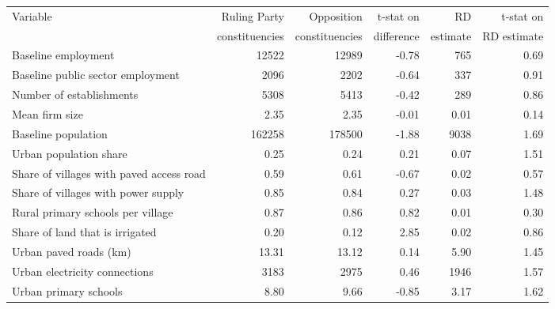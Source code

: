 \begin{tabular}{l r r r r r}\hline\hline Variable & Ruling Party & Opposition & t-stat on & RD & t-stat on \\ & constituencies & constituencies & difference & estimate & RD estimate \\ \hline
Baseline employment &  12522 &  12989 & -0.78 &    765 &  0.69\\
\hspace{1 cm}Baseline public sector employment &   2096 &   2202 & -0.64 &    337 &  0.91\\
Number of establishments &   5308 &   5413 & -0.42 &    289 &  0.86\\
Mean firm size &   2.35 &   2.35 & -0.01 &   0.01 &  0.14\\
Baseline population & 162258 & 178500 & -1.88 &   9038 &  1.69\\
Urban population share &   0.25 &   0.24 &  0.21 &   0.07 &  1.51\\
Share of villages with paved access road &   0.59 &   0.61 & -0.67 &   0.02 &  0.57\\
Share of villages with power supply &   0.85 &   0.84 &  0.27 &   0.03 &  1.48\\
Rural primary schools per village &   0.87 &   0.86 &  0.82 &   0.01 &  0.30\\
Share of land that is irrigated &   0.20 &   0.12 &  2.85 &   0.02 &  0.86\\
Urban paved roads (km) &  13.31 &  13.12 &  0.14 &   5.90 &  1.45\\
Urban electricity connections &   3183 &   2975 &  0.46 &   1946 &  1.57\\
Urban primary schools &   8.80 &   9.66 & -0.85 &   3.17 &  1.62\\
\hline\end{tabular}
